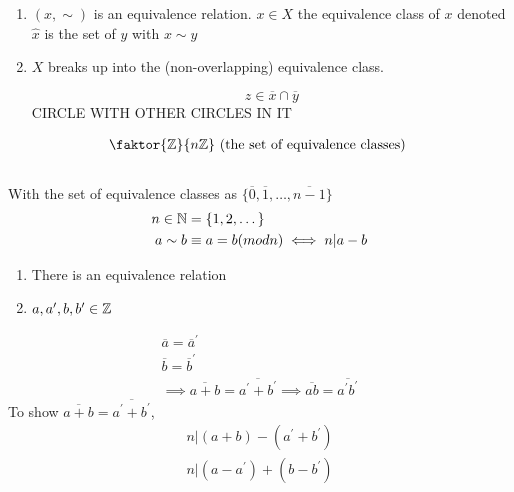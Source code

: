 \documentclass[../notes.tex]{subfiles}
\begin{document}
\begin{definition}
    \begin{enumerate}
        \item $(x,\sim)$ is an equivalence relation. $x\in X$ the
            equivalence class of $x$ denoted $\hat{x}$ is the set of $y$ with
            $x\sim y$
        \item $X$ breaks up into the (non-overlapping) equivalence class.
            \begin{center}
                \[
                    z\in \overline{x}\cap\overline{y}
                \]
                \Large{CIRCLE WITH OTHER CIRCLES IN IT}
            \end{center}
    \end{enumerate}
\end{definition}
\begin{definition}
    \begin{align*}
        \faktor{\Z}{n\Z}\text{ (the set of equivalence classes) }\\\\
    \end{align*}
    With the set of equivalence classes as $\{\overline{0}, \overline{1},
    \dots, \overline{n-1}\}$
    \begin{align*}
        n\in \mathbb{N}&=\{1,2,\dots\}\\
        a\sim b &\equiv a=b(mod n) \iff n|a-b\\
    \end{align*}
    \begin{enumerate}
        \item There is an equivalence relation
        \item $a, a^{\prime},b, b^{\prime}\in \mathbb{Z}$
    \end{enumerate}
\end{definition}
\begin{align*}
    \overline{a}=\overline{a}^{\prime}\\
    \overline{b}=\overline{b}^{\prime}\\
    \implies \overline{a+b}=\overline{a^{\prime}+b^{\prime}}
    \implies \overline{ab}=\overline{a^{\prime}b^{\prime}}
\end{align*}
To show $\overline{a+b}=\overline{a^{\prime}+b^{\prime}}$,
\begin{align*}
    n|(a+b)-(a^{\prime}+b^{\prime})\\
    n|(a-a^{\prime})+(b-b^{\prime})\\
\end{align*}
\end{document}
